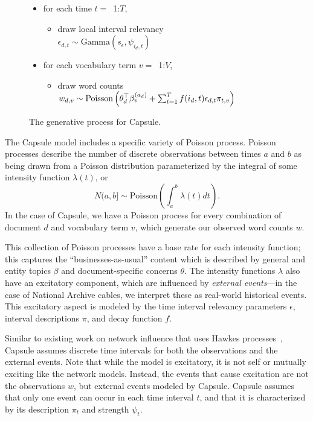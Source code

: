 \begin{figure}[htb]
\begin{mdframed}
\begin{itemize}[leftmargin=*]
\begin{itemize}[leftmargin=*]
\begin{itemize}[leftmargin=*]
		\end{itemize}
	\item for each time $t=$~1:$T$,
		\begin{itemize}[leftmargin=*]
			\item draw local interval relevancy \\$\epsilon_{d,t} \sim \mbox{Gamma}(s_\epsilon, \psi_{i_d,t})$ 
		\end{itemize}
	\item for each vocabulary term $v=$~1:$V$,
		\begin{itemize}[leftmargin=*]
			\item draw word counts $w_{d,v} \sim \\ \mbox{Poisson}\left(\theta_d^\top\beta^{(a_d)}_v + \sum_{t=1}^T f(i_d, t) \epsilon_{d,t} \pi_{t,v}\right)$
		\end{itemize}
	\end{itemize}
\end{itemize}
\end{mdframed}
\caption{The generative process for Capsule.}
\label{fig:generative-model}
\end{figure}


  The Capsule model includes a specific variety of Poisson process.
Poisson processes describe the number of discrete observations between times $a$ and $b$ as being drawn from a Poisson distribution parameterized by the integral of some intensity function $\lambda(t)$, or
\[ N(a,b] \sim \mbox{Poisson}\left(\int_a^b \lambda(t) dt\right). \]
In the case of Capsule, we have a Poisson process for every combination of document $d$ and vocabulary term $v$, which generate our observed word counts $w$.

This collection of Poisson processes have a base rate for each intensity function; this captures the ``businesses-as-usual'' content which is described by general and entity topics $\beta$ and document-specific concerns $\theta$.  The intensity functions $\lambda$ also have an excitatory component, which are influenced by \emph{external events}---in the case of National Archive cables, we interpret these as real-world historical events. This excitatory aspect is modeled by the time interval relevancy parameters $\epsilon$, interval descriptions $\pi$, and decay function $f$.

Similar to existing work on network influence that uses Hawkes processes~\cite{linderman2015scalable,guo2014bayesian}, Capsule assumes discrete time intervals for both the observations and the external events.
Note that while the model is excitatory, it is not self or mutually exciting like the network models.  Instead, the events that cause excitation are not the observations $w$, but external events modeled by Capsule.  Capsule assumes that only one event can occur in each time interval $t$, and that it is characterized by its description $\pi_t$ and strength $\psi_t$. 

